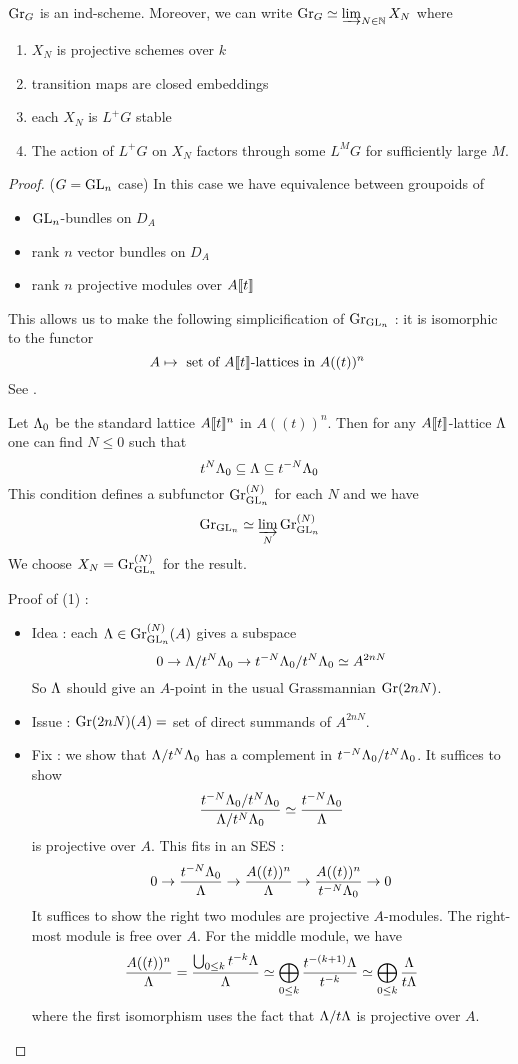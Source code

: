 \documentclass{article}
\begin{document}
\begin{prop}
  
  $\operatorname{Gr}_G$ is an ind-scheme.
  Moreover, we can write $\operatorname{Gr}_G \simeq \varinjlim_{N \in \mathbb{N}} X_N$ where
  \begin{enumerate}
    \item $X_N$ is projective schemes over $k$
    \item transition maps are closed embeddings
    \item each $X_N$ is $L^+G$ stable
    \item The action of $L^+G$ on $X_N$ factors through some
    $L^M G$ for sufficiently large $M$.
  \end{enumerate}
\end{prop}
\begin{proof}
  ($G = \operatorname{GL}_n$ case)
  In this case we have equivalence between groupoids of 
  \begin{itemize}
    \item $\operatorname{GL}_n$-bundles on $D_A$
    \item rank $n$ vector bundles on $D_A$
    \item rank $n$ projective modules over $A\llbracket t \rrbracket$
  \end{itemize}
  This allows us to make the following simplicification of 
  $\operatorname{Gr}_{\operatorname{GL}_n}$ : 
  it is isomorphic to the functor
  \[
    A \mapsto \text{
    set of $A\llbracket t \rrbracket$-lattices in $A((t))^n$
  }
  \]
  See .
  
  Let $\Lambda_0$ be the standard lattice $A\llbracket t \rrbracket^n$ in $A((t))^n$.
  Then for any $A\llbracket t \rrbracket$-lattice $\Lambda$ one can find $N \leq 0$ such that 
  \[
    t^N \Lambda_0 \subseteq \Lambda \subseteq t^{-N}\Lambda_0
  \]
  This condition defines a subfunctor $\operatorname{Gr}_{\operatorname{GL}_n}^{(N)}$ for each $N$
  and we have \[
    \operatorname{Gr}_{\operatorname{GL}_n} \simeq \varinjlim_{N} \operatorname{Gr}_{\operatorname{GL}_n}^{(N)}
  \]
  We choose $X_N = \operatorname{Gr}_{\operatorname{GL}_n}^{(N)}$ for the result.

  Proof of (1) :
  \begin{itemize}
    \item Idea : each $\Lambda \in \operatorname{Gr}_{\operatorname{GL}_n}^{(N)}(A)$ gives
    a subspace 
    \[
      0 \to \Lambda / t^N \Lambda_0 \to t^{-N} \Lambda_0 / t^N \Lambda_0 \simeq A^{2nN}
    \]
    So $\Lambda$ should give an $A$-point in the usual Grassmannian $\operatorname{Gr}(2nN)$.
    \item Issue : $\operatorname{Gr}(2nN)(A) =$ set of direct summands of $A^{2nN}$.
    \item Fix : we show that $\Lambda / t^N \Lambda_0$ has a complement in
    $t^{-N} \Lambda_0 / t^N \Lambda_0$.
    It suffices to show 
    \[
      \frac{t^{-N} \Lambda_0 / t^N \Lambda_0}{\Lambda / t^N \Lambda_0} \simeq
      \frac{t^{-N}\Lambda_0}{\Lambda}
    \]
    is projective over $A$.
    This fits in an SES : 
    \[
      0 \to \frac{t^{-N}\Lambda_0}{\Lambda} \to
      \frac{A((t))^n}{\Lambda} \to \frac{A((t))^n}{t^{-N}\Lambda_0} \to 0
    \]
    It suffices to show the right two modules are projective $A$-modules.
    The right-most module is free over $A$.
    For the middle module, we have 
    \[
      \frac{A((t))^n}{\Lambda} = \frac{\bigcup_{0 \leq k} t^{-k} \Lambda}{\Lambda}
      \simeq \bigoplus_{0 \leq k} \frac{t^{-(k+1)}\Lambda}{t^{-k}}
      \simeq \bigoplus_{0 \leq k} \frac{\Lambda}{t \Lambda}
    \]
    where the first isomorphism uses the fact that
    $\Lambda / t \Lambda$ is projective over $A$.


\end{itemize}
\end{proof}
\end{document}
